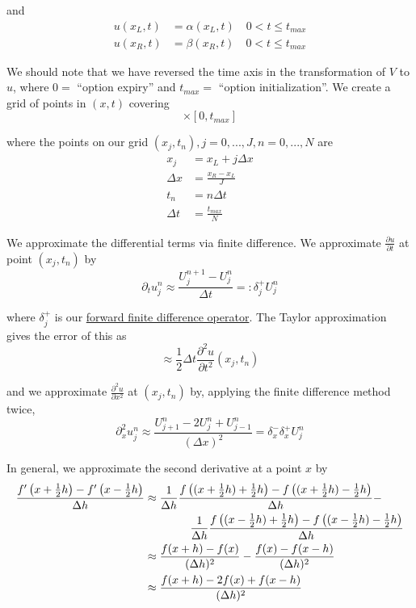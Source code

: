 \documentclass[12pt]{article}
\newlength\tindent
\renewcommand{\indent}{\hspace*{\tindent}}
\begin{document}
and
\begin{align*}
	u(x_L, t) &= \alpha(x_L, t) \quad 0 < t \leq t_{max} \\
	u(x_R, t) &= \beta(x_R, t) \quad 0 < t \leq t_{max}
\end{align*}

\indent We should note that we have reversed the time axis in the transformation of $V$ to $u$, where $0 = $ ``option expiry'' and $t_{max} = $ ``option initialization''. We create a grid of points in $(x, t)$ covering
\begin{equation*}
	[x_L, x_R] \times [0, t_{max}]
\end{equation*}

where the points on our grid $(x_j, t_n), j = 0, ..., J, n = 0, ..., N$ are
\begin{align*}
	x_j &= x_L + j\Delta x \\
	\Delta x &= \frac{x_R - x_L}{J} \\
	t_n &= n\Delta t \\
	\Delta t &= \frac{t_{max}}{N}
\end{align*}

\indent We approximate the differential terms via finite difference. We approximate $\frac{\partial u}{\partial t}$ at point $(x_j, t_n)$ by
\begin{equation*}
	\partial_t u^n_j \approx \frac{U^{n + 1}_j - U^n_j}{\Delta t} =: \delta^+_j U^n_j
\end{equation*}

where $\delta^+_j$ is our \underline{forward finite difference operator}. The Taylor approximation gives the error of this as 
\begin{equation*}
	\approx \frac{1}{2} \Delta t \frac{\partial^2 u}{\partial t^2}(x_j, t_n)
\end{equation*}

and we approximate $\frac{\partial^2 u}{\partial x^2}$ at $(x_j, t_n)$ by, applying the finite difference method twice,
\begin{equation*}
	\partial^2_x u^n_j \approx \frac{ U^n_{j + 1} - 2U^n_j + U^n_{j - 1} }{ (\Delta x)^2 } = \delta^-_x\delta^+_x U^n_j
\end{equation*}

In general, we approximate the second derivative at a point $x$ by
\begin{align*}
	\frac{ f'\left(x + \frac{1}{2}h\right) - f'\left(x - \frac{1}{2}h\right)}{ \Delta h } &\approx \frac{1}{\Delta h}  \frac{ f\left( (x + \frac{1}{2}h) + \frac{1}{2}h\right) - f\left((x + \frac{1}{2}h) - \frac{1}{2}h\right) }{ \Delta h } - \\
	&\hphantom{{}={\approx \frac{1}{\Delta h} }} \frac{1}{ \Delta h } \frac{ f\left( (x - \frac{1}{2}h) + \frac{1}{2}h\right) - f\left((x - \frac{1}{2}h) - \frac{1}{2}h\right) }{ \Delta h } \\
	&\approx \frac{ f(x + h) - f(x) }{(\Delta h)^2} - \frac{f(x) - f(x - h)}{(\Delta h)^2} \\
	&\approx \frac{ f(x + h) - 2f(x) + f(x - h)}{(\Delta h)^2}
\end{align*}
\end{document}
